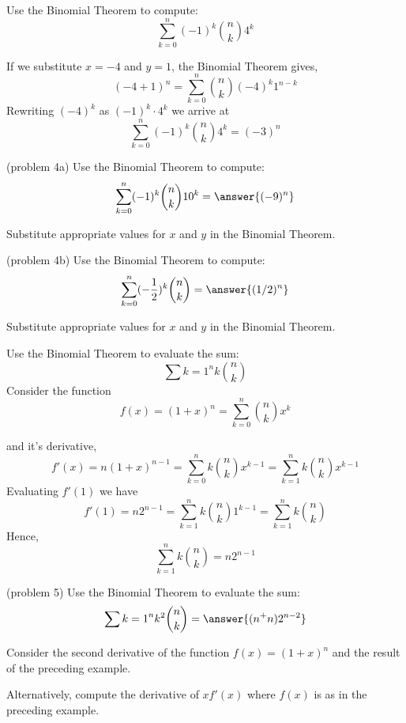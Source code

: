 \documentclass[handout]{ximera}
\begin{document}
\begin{example}[example 4]
Use the Binomial Theorem to compute:
\[
\sum_{k=0}^n (-1)^k\binom{n}{k}4^k 
\]

If we substitute $x=-4$ and $y=1$, the Binomial Theorem gives,
\[
(-4+1)^n = \sum_{k=0}^n \binom{n}{k} (-4)^k 1^{n-k}
\]
Rewriting $(-4)^k$ as $(-1)^k \cdot 4^k$ we arrive at
\[
\sum_{k=0}^n (-1)^k\binom{n}{k}4^k = (-3)^n
\]
\end{example}

\begin{problem}(problem 4a)
Use the Binomial Theorem to compute:
\[
\sum_{k=0}^n (-1)^k\binom{n}{k}10^k = \answer{(-9)^n}
\]
\begin{hint}
Substitute appropriate values for $x$ and $y$ in the Binomial Theorem.
\end{hint}

\end{problem}

\begin{problem}(problem 4b)
Use the Binomial Theorem to compute:
\[
\sum_{k=0}^n (-\frac12)^k\binom{n}{k} = \answer{(1/2)^n}
\]
\begin{hint}
Substitute appropriate values for $x$ and $y$ in the Binomial Theorem.
\end{hint}

\end{problem}

\begin{example}[example 5]
Use the Binomial Theorem to evaluate the sum:
\[
\sum{k=1}^{n} k\binom{n}{k}
\]
Consider the function 
\[
f(x) = (1+x)^n =\sum_{k=0}^n \binom{n}{k} x^k
\]

and it's derivative, 
\[
f'(x) = n(1+x)^{n-1}= \sum_{k=0}^n k\binom{n}{k} x^{k-1} = \sum_{k=1}^n k\binom{n}{k} x^{k-1}
\]
Evaluating $f'(1)$ we have
\[
f'(1) = n2^{n-1} = \sum_{k=1}^n k\binom{n}{k} 1^{k-1} = \sum_{k=1}^n k\binom{n}{k}
\]
Hence,
\[
\sum_{k=1}^n k\binom{n}{k} = n2^{n-1}
\]
\end{example}

\begin{problem}(problem 5)
Use the Binomial Theorem to evaluate the sum:
\[
 \sum{k=1}^n k^2 \binom {n}{k} = \answer{(n^+n)2^{n-2}}
\]
\begin{hint}
Consider the second derivative of the function $f(x) = (1+x)^n$ and the result of the preceding example.
\end{hint}
\begin{hint}
Alternatively, compute the derivative of $xf'(x)$ where $f(x)$ is as in the preceding example.
\end{hint}

\end{problem}
\end{document}
